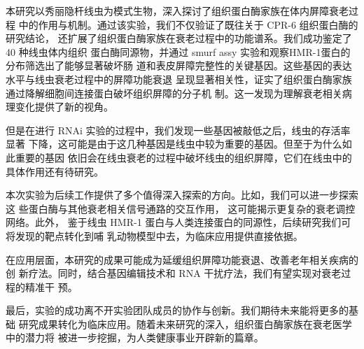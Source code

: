 本研究以秀丽隐杆线虫为模式生物，深入探讨了组织蛋白酶家族在体内屏障衰老过程  中的作用与机制。通过该实验，我们不仅验证了既往关于 CPR-6 组织蛋白酶的研究结论， 还扩展了组织蛋白酶家族在衰老过程中的功能谱系。我们成功鉴定了 40 种线虫体内组织  蛋白酶同源物，并通过 smurf assy 实验和观察HMR-1蛋白的分布筛选出了能够显著破坏肠 道和表皮屏障完整性的关键基因。这些基因的表达水平与线虫衰老过程中的屏障功能衰退  呈现显著相关性，证实了组织蛋白酶家族通过降解细胞间连接蛋白破坏组织屏障的分子机  制。这一发现为理解衰老相关病理变化提供了新的视角。

但是在进行 RNAi 实验的过程中，我们发现一些基因被敲低之后，线虫的存活率显著 下降，这可能是由于这几种基因是线虫中较为重要的基因。但至于为什么如此重要的基因 依旧会在线虫衰老的过程中破坏线虫的组织屏障，它们在线虫中的具体作用还有待研究。

本次实验为后续工作提供了多个值得深入探索的方向。比如，我们可以进一步探索这  些蛋白酶与其他衰老相关信号通路的交互作用， 这可能揭示更复杂的衰老调控网络。此外， 鉴于线虫 HMR-1 蛋白与人类连接蛋白的同源性，后续研究我们可将发现的靶点转化到哺  乳动物模型中去，为临床应用提供直接依据。

在应用层面，本研究的成果可能成为延缓组织屏障功能衰退、改善老年相关疾病的创 新疗法。同时，结合基因编辑技术和 RNA 干扰疗法，我们有望实现对衰老过程的精准干 预。

最后，实验的成功离不开实验团队成员的协作与创新。我们期待未来能将更多的基础 研究成果转化为临床应用。随着未来研究的深入，组织蛋白酶家族在衰老医学中的潜力将 被进一步挖掘，为人类健康事业开辟新的篇章。
